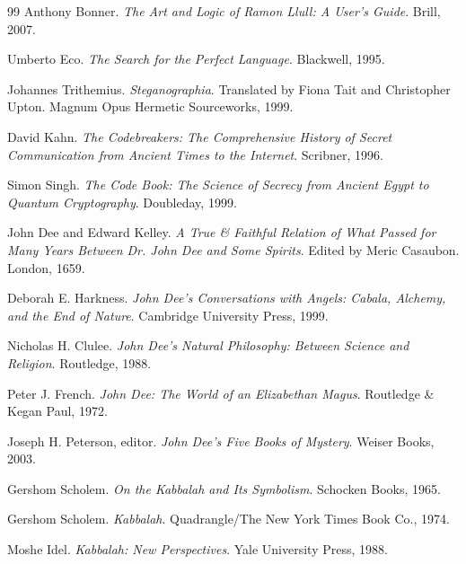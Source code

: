 \documentclass[11pt]{book}
\begin{document}
\begin{thebibliography}{99}
Anthony Bonner.
\newblock \emph{The Art and Logic of Ramon Llull: A User's Guide}.
\newblock Brill, 2007.

Umberto Eco.
\newblock \emph{The Search for the Perfect Language}.
\newblock Blackwell, 1995.

Johannes Trithemius.
\newblock \emph{Steganographia}.
\newblock Translated by Fiona Tait and Christopher Upton. Magnum Opus Hermetic Sourceworks, 1999.

David Kahn.
\newblock \emph{The Codebreakers: The Comprehensive History of Secret Communication from Ancient Times to the Internet}.
\newblock Scribner, 1996.

Simon Singh.
\newblock \emph{The Code Book: The Science of Secrecy from Ancient Egypt to Quantum Cryptography}.
\newblock Doubleday, 1999.

John Dee and Edward Kelley.
\newblock \emph{A True \& Faithful Relation of What Passed for Many Years Between Dr. John Dee and Some Spirits}.
\newblock Edited by Meric Casaubon. London, 1659.

Deborah E. Harkness.
\newblock \emph{John Dee's Conversations with Angels: Cabala, Alchemy, and the End of Nature}.
\newblock Cambridge University Press, 1999.

Nicholas H. Clulee.
\newblock \emph{John Dee's Natural Philosophy: Between Science and Religion}.
\newblock Routledge, 1988.

Peter J. French.
\newblock \emph{John Dee: The World of an Elizabethan Magus}.
\newblock Routledge \& Kegan Paul, 1972.

Joseph H. Peterson, editor.
\newblock \emph{John Dee's Five Books of Mystery}.
\newblock Weiser Books, 2003.

Gershom Scholem.
\newblock \emph{On the Kabbalah and Its Symbolism}.
\newblock Schocken Books, 1965.

Gershom Scholem.
\newblock \emph{Kabbalah}.
\newblock Quadrangle/The New York Times Book Co., 1974.

Moshe Idel.
\newblock \emph{Kabbalah: New Perspectives}.
\newblock Yale University Press, 1988.


\end{thebibliography}
\end{document}
